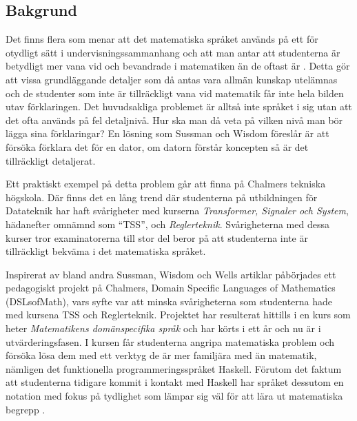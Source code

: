 \documentclass[12pt,a4paper,twoside,openright]{article}
\begin{document}
\subsection{Bakgrund}
%

Det finns flera som menar att det matematiska språket används på ett för
otydligt sätt i undervisningssammanhang och att man antar att studenterna
är betydligt mer vana vid och bevandrade i matematiken än de oftast är
\cite{sussman2002role} \cite{wells1995communicating}.
Detta gör att vissa grundläggande detaljer som då antas vara allmän kunskap
utelämnas och de studenter som inte är tillräckligt vana vid matematik får inte
hela bilden utav förklaringen.
Det huvudsakliga problemet är alltså inte språket i sig utan att det ofta
används på fel detaljnivå. Hur ska man då veta på vilken nivå man bör lägga
sina förklaringar? En lösning som Sussman och Wisdom föreslår är att
försöka förklara det för en dator, om datorn förstår koncepten så är det
tillräckligt detaljerat.

Ett praktiskt exempel på detta problem går att finna på Chalmers tekniska högskola.
Där finns det en lång trend där studenterna på utbildningen för Datateknik har
haft svårigheter med kurserna \textit{Transformer, Signaler och System}, hädanefter
omnämnd som ``\gls{TSS}'', och \textit{Reglerteknik}.
Svårigheterna med dessa kurser tror examinatorerna till stor del beror på att
studenterna inte är tillräckligt bekväma i det matematiska språket.

Inspirerat av bland andra Sussman, Wisdom och Wells artiklar påbörjades ett
pedagogiskt projekt på Chalmers, Domain Specific Languages of Mathematics (\gls{DSLsofMath}), vars syfte var att minska
svårigheterna som studenterna hade med kursena TSS och Reglerteknik.
Projektet har resulterat hittills i en kurs som heter
\textit{Matematikens domänspecifika språk} och har körts i ett år och nu
är i utvärderingsfasen. I kursen får studenterna angripa
matematiska problem och försöka lösa dem med ett verktyg de är
mer familjära med än matematik, nämligen det funktionella
programmerings\-språket Haskell. Förutom det faktum att studenterna tidigare
kommit i kontakt med Haskell har språket dessutom en notation med fokus på
tydlighet som lämpar sig väl för att lära ut matematiska begrepp
\cite{TFPIE15_DSLsofMath_IonescuJansson}.
\end{document}
